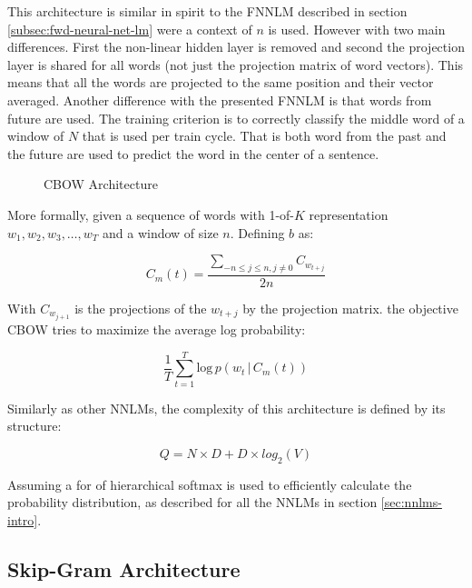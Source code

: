 This architecture is similar in spirit to the  \ac{FNNLM} described in section
\ref{subsec:fwd-neural-net-lm} were a context of $n$ is used. However with two main differences. First the
non-linear hidden layer is removed and second the projection layer is shared for
all words (not just the projection matrix of word vectors). This means that
all the words are projected to the same position and their vector averaged.
Another difference with the presented \ac{FNNLM}  is that words from future are used. 
The training criterion is to correctly classify the middle word of a window
of $N$ that is used per train cycle. That is both word from the past and the
future are used to predict the word in the center of a sentence.


\begin{figure}[h]
    \centering
    \caption{CBOW Architecture}
    \label{fig:cbow-architecture-alone}
\end{figure}

More formally, given a sequence of words with 1-of-$K$ representation $w_1,w_2,w_3, \dots, w_T$ and a window
of size $n$. Defining $b$ as:

\begin{equation}
   C_{m}(t) =    \frac{\sum_{-n \leq j \leq n, j \neq 0} { 
       C_{w_{t+j}}} } {2n}    
\end{equation}

With $C_{w_{j+1}}$ is the projections of the $w_{t+j}$ by the projection
matrix. the  objective  \ac{CBOW}  tries to maximize the average log probability:


\begin{equation}
  \label{eq:logprob-cbow}
   \frac{1}{T} \sum^{T}_{t=1} \text{log} \, p
     \left( w_t \, |\, C_{m}(t) \right)
\end{equation}




Similarly as other \ac{NNLM}s, the complexity of this architecture
is defined by its structure:

\begin{equation}
  Q = N \times D + D \times  log_2(V)
\end{equation}

Assuming a for of hierarchical softmax is used to efficiently calculate the
probability distribution, as described for all the \ac{NNLM}s in section \ref{sec:nnlms-intro}.


\subsection{Skip-Gram Architecture}
\label{sec:skip-gram-architecture}

